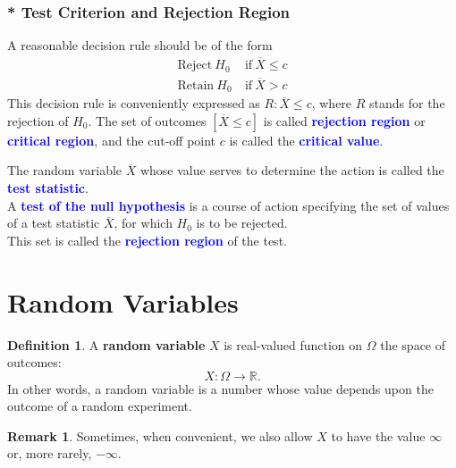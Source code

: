 \documentclass[12pt,openany]{book}
\theoremstyle{definition}
\newtheorem{definition}{Definition}[chapter]
\newtheorem{remark}{Remark}[chapter]
\begin{document}
	\subsubsection*{* Test Criterion and Rejection Region}
	A reasonable decision rule should be of the form \begin{align*}
		\text{Reject}\ H_0\ &\text{if}\ \overline{X}\leq c \\
		\text{Retain}\ H_0\ &\text{if}\ \overline{X}> c
	\end{align*} This decision rule is conveniently expressed as $R:\overline{X}\leq c$, where $R$ stands for the rejection of $H_0$. The set of outcomes $[\overline{X}\leq c ]$ is called \textcolor{blue}{\bf rejection region} or \textcolor{blue}{\bf critical region}, and the cut-off point $c$ is called the \textcolor{blue}{\bf critical value}.
	\\
	\begin{tcolorbox}[colback=white]
		The random variable $\overline{X}$ whose value serves to determine the action is called the 
		\textcolor{blue}{\bf test statistic}. \\ 
		A \textcolor{blue}{\bf test of the null hypothesis} is a course of action specifying the set of values of a test statistic $\overline{X}$, for which $H_0$ is to be rejected. \\
		This set is called the \textcolor{blue}{\bf rejection region} of the test.
	\end{tcolorbox}
	
	\newpage
	\section{Random Variables}
	\begin{tcolorbox}[colframe=defcolor,title={\color{white}\bf Random Variable}]
		\begin{definition}
			A \textbf{random variable} $X$ is real-valued function on $\Omega$ the space of outcomes: \[
			X:\Omega\to\mathbb{R}.
			\] In other words, a random variable is a number whose value depends upon the outcome of a random experiment.
		\end{definition}
	\end{tcolorbox}
	\begin{remark}
		Sometimes, when convenient, we also allow $X$ to have the value $\infty$ or, more rarely, $-\infty$.
	\end{remark}
	
\end{document}
